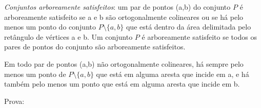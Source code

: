 \textit{Conjuntos arboreamente satisfeitos}: um par de pontos (a,b) do conjunto $P$ é arboreamente satisfeito se a e b são ortogonalmente colineares ou se há pelo menos um ponto do conjunto \( P \setminus \{a,b\} \) que está dentro da área delimitada pelo retângulo de vértices a e b. Um conjunto $P$ é arboreamente satisfeito se todos os pares de pontos do conjunto são arboreamente satisfeitos.

Em todo par de pontos (a,b) não ortogonalmente colineares, há sempre pelo menos um ponto de \( P \setminus \{a,b\} \) que está em alguma aresta que incide em a, e há também pelo menos um ponto que está em alguma aresta que incide em b.


Prova: 